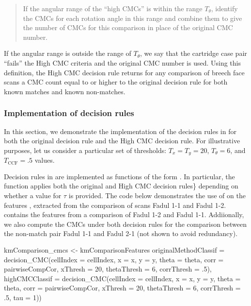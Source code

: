 \begin{quote}
If the angular range of the ``high CMCs'' is within the range
\(T_\theta\), identify the CMCs for each rotation angle in this range
and combine them to give the number of CMCs for this comparison in place
of the original CMC number.
\end{quote}

If the angular range is outside the range of \(T_\theta\), we say that
the cartridge case pair ``fails'' the High CMC criteria and the original
CMC number is used. Using this definition, the High CMC decision rule
returns for any comparison of breech face scans a CMC count equal to or
higher to the original decision rule for both known matches and known
non-matches.

\hypertarget{decisionRuleImplementation}{%
\subsubsection{Implementation of decision
rules}\label{decisionRuleImplementation}}

In this section, we demonstrate the implementation of the decision rules
in  for both the original decision rule and the High CMC
decision rule. For illustrative purposes, let us consider a particular
set of thresholds: \(T_x = T_y = 20\), \(T_{\theta} = 6\), and
\(T_{\text{CCF}} = .5\) values.

Decision rules in  are implemented as functions of the
form . In particular, the 
function applies both the original and High CMC decision rules\}
depending on whether a value for \(\tau\) is provided. The code below
demonstrates the use of  on the features
, extracted from the comparison of scans
Fadul 1-1 and Fadul 1-2.  contains the
features from a comparison of Fadul 1-2 and Fadul 1-1. Addiionally, we
also compute the CMCs under both decision rules for the comparison
between the non-match pair Fadul 1-1 and Fadul 2-1 (not shown to avoid
redundancy).

\begin{Schunk}
\begin{Sinput}
kmComparison_cmcs <- kmComparisonFeatures %
  originalMethodClassif =
    decision_CMC(cellIndex = cellIndex, x = x, y = y, theta = theta,
                 corr = pairwiseCompCor, xThresh = 20, thetaThresh = 6,
                 corrThresh = .5),
  highCMCClassif =
    decision_CMC(cellIndex = cellIndex, x = x, y = y, theta = theta,
                 corr = pairwiseCompCor, xThresh = 20, thetaThresh = 6,
                 corrThresh = .5, tau = 1))
\end{Sinput}
\end{Schunk}

